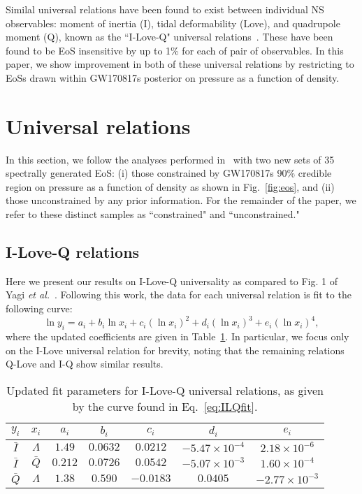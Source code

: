 \documentclass[prd,twocolumn,nofootinbib,superscriptaddress,amsmath,amssymb]{revtex4-1}
\begin{document}
Similal universal relations have been found to exist between individual NS observables: moment of inertia (I), tidal deformability (Love), and quadrupole moment (Q), known as the ``I-Love-Q" universal relations~\cite{Yagi:ILQ}.
These have been found to be EoS insensitive by up to 1\% for each of pair of observables.
In this paper, we show improvement in both of these universal relations by restricting to EoSs drawn within GW170817s posterior on pressure as a function of density.
\section{Universal relations}\label{sec:universal}
In this section, we follow the analyses performed in~\cite{Yagi:binLove,Yagi:ILQ} with two new sets of 35 spectrally generated EoS: (i) those constrained by GW170817s 90\% credible region on pressure as a function of density as shown in Fig.~\ref{fig:eos}, and (ii) those unconstrained by any prior information.
For the remainder of the paper, we refer to these distinct samples as ``constrained" and ``unconstrained." 

\subsection{I-Love-Q relations}\label{sec:ilq}
Here we present our results on I-Love-Q universality as compared to Fig. 1 of Yagi \textit{et al.}~\cite{Yagi:ILQ}.
Following this work, the data for each universal relation is fit to the following curve:
\begin{equation}\label{eq:ILQfit}
\ln{y_i}=a_i+b_i \ln{x_i} + c_i (\ln{x_i})^2 + d_i (\ln{x_i})^3 + e_i (\ln{x_i})^4,
\end{equation}
where the updated coefficients are given in Table~\ref{tab:ILQfit}.
In particular, we focus only on the I-Love universal relation for brevity, noting that the remaining relations Q-Love and I-Q show similar results.

\begin{table}[ht!]
\centering
\caption{
Updated fit parameters for I-Love-Q universal relations, as given by the curve found in Eq.~\ref{eq:ILQfit}.
}\label{tab:ILQfit}
\begin{tabular}{ c  c | c c c c c } 
 \hline
 \hline
 $y_i$ & $x_i$ & $a_i$ & $b_i$ & $c_i$ & $d_i$ & $e_i$ \\
 \hline
 $\bar{I}$ & $\Lambda$ & $1.49$ & $0.0632$ & $0.0212$ & $-5.47 \times 10^{-4}$ & $2.18 \times 10^{-6}$ \\
 $\bar{I}$ & $\bar{Q}$ & $0.212$ & $0.0726$ & $0.0542$ & $-5.07 \times 10^{-3}$ & $1.60 \times 10^{-4}$ \\
 $\bar{Q}$ & $\Lambda$ & $1.38$ & $0.590$ & $-0.0183$ & $0.0405$ & $-2.77 \times 10^{-3}$ \\ 
 \hline
 \hline
\end{tabular}
\end{table}
\end{document}
